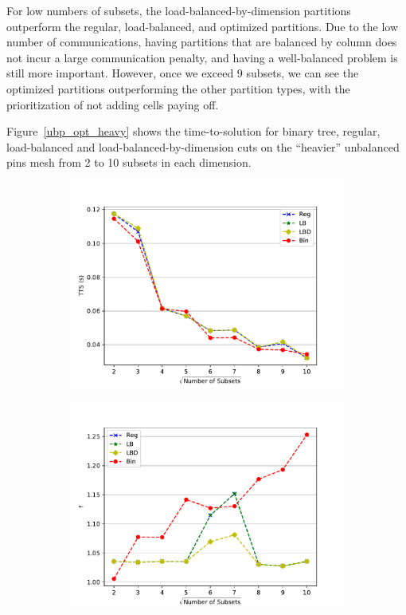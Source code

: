 For low numbers of subsets, the load-balanced-by-dimension partitions outperform the regular, load-balanced, and optimized partitions.
Due to the low number of communications, having partitions that are balanced by column does not incur a large communication penalty, and having a well-balanced problem is still more important.
However, once we exceed 9 subsets, we can see the optimized partitions outperforming the other partition types, with the prioritization of not adding cells paying off.

Figure~\ref{ubp_opt_heavy} shows the time-to-solution for binary tree, regular, load-balanced and load-balanced-by-dimension cuts on the ``heavier'' unbalanced pins mesh from 2 to 10 subsets in each dimension.
\begin{figure}[h]
\centering
  \begin{subfigure}[t]{0.49\textwidth}
    \centering
     \includegraphics[scale=0.55]{../../figures/more_sparse_best_comp.pdf}
  \end{subfigure}
  \begin{subfigure}[t]{0.49\textwidth}
    \centering
    \includegraphics[scale=0.55]{../../figures/more_sparse_metric_comp.pdf}

\end{subfigure}
\end{figure}

